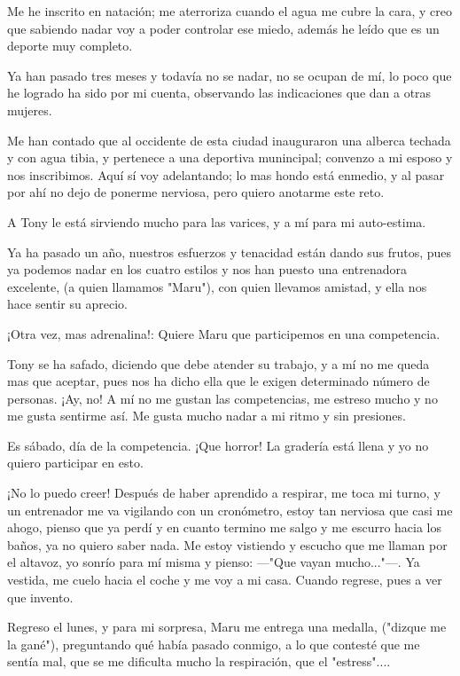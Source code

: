 \documentclass[letterpaper, 12pt]{book}
\begin{document}
Me he inscrito en natación; me aterroriza cuando el agua me cubre la cara, y creo que sabiendo nadar voy a poder controlar ese miedo, además he leído que es un deporte muy completo.

Ya han pasado tres meses y todavía no se nadar, no se ocupan de mí, lo poco que he logrado ha sido por mi cuenta, observando las indicaciones que dan a otras mujeres.

Me han contado que al occidente de esta ciudad inauguraron una alberca techada y con agua tibia, y pertenece a una deportiva munincipal; convenzo a mi esposo y nos inscribimos. Aquí sí voy adelantando; lo mas hondo está enmedio, y al pasar por ahí no dejo de ponerme nerviosa, pero quiero anotarme este reto.

A Tony le está sirviendo mucho para las varices, y a mí para mi auto-estima.

Ya ha pasado un año, nuestros esfuerzos y tenacidad están dando sus frutos, pues ya podemos nadar en los cuatro estilos y nos han puesto una entrenadora excelente, (a quien llamamos "Maru"), con quien llevamos amistad, y ella nos hace sentir su aprecio.

¡Otra vez, mas adrenalina!: Quiere Maru que participemos en una competencia.

Tony se ha safado, diciendo que debe atender su trabajo, y a mí no me queda mas que aceptar, pues nos ha dicho ella que le exigen determinado número de personas. ¡Ay, no! A mí no me gustan las competencias, me estreso mucho y no me gusta sentirme así. Me gusta mucho nadar a mi ritmo y sin presiones.

Es sábado, día de la competencia. ¡Que horror! La gradería está llena y yo no quiero participar en esto. 

¡No lo puedo creer! Después de haber aprendido a respirar, me toca mi turno, y un entrenador me va vigilando con un cronómetro, estoy tan nerviosa que casi me ahogo, pienso que ya perdí y en cuanto termino me salgo y me escurro hacia los baños, ya no quiero saber nada. Me estoy vistiendo y escucho que me llaman por el altavoz, yo  sonrío para mí misma y pienso: ---"Que vayan mucho..."---.  Ya vestida, me cuelo hacia el coche y me voy a mi casa. Cuando regrese, pues a ver que invento.

Regreso el lunes, y para mi sorpresa, Maru me entrega una medalla, ("dizque me la gané"), preguntando qué había pasado conmigo, a lo que contesté que me sentía mal, que se me dificulta mucho la respiración, que el "estress"....
\end{document}
